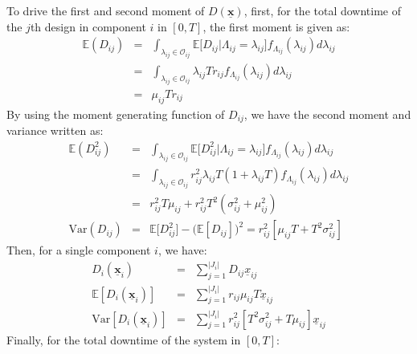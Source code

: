 \documentclass[preprint,12pt]{elsarticle}
\begin{document}
To drive the first and second moment of $D(\boldsymbol{\underline{x}})$, first, for the total downtime of the $j$th design in component $i$ in $[0, T]$, the first moment is given as:
\small
\begin{eqnarray}
\mathbb{E}(D_{ij}) &=& \int_{\lambda_{ij}\in \mathcal O_{ij}}\mathbb{E}\bigg[D_{ij} \bigg\vert \Lambda_{ij}=\lambda_{ij}\bigg]f_{\Lambda_{ij}}(\lambda_{ij})d\lambda_{ij} \nonumber\\
 &=& \int_{\lambda_{ij}\in \mathcal O_{ij} } \lambda_{ij}T r_{ij}f_{\Lambda_{ij}}(\lambda_{ij})d\lambda_{ij} \nonumber\\
 &=& \mu_{ij} T r_{ij}
\end{eqnarray}
\normalsize
By using the moment generating function of $D_{ij}$, we have the second moment and variance written as:
\small
\begin{eqnarray}
\mathbb{E}(D^{2}_{ij}) &=& \int_{\lambda_{ij}\in \mathcal O_{ij}}\mathbb{E}\bigg[D^{2}_{ij} \bigg\vert \Lambda_{ij}=\lambda_{ij}\bigg]f_{\Lambda_{ij}}(\lambda_{ij})d\lambda_{ij}  \nonumber\\
&=& \int_{\lambda_{ij}\in \mathcal O_{ij}} {r^{2}_{ij}\lambda_{ij}T(1+\lambda_{ij}T)f_{\Lambda_{ij}}(\lambda_{ij})d\lambda_{ij}} \nonumber\\
&=& r^{2}_{ij}T\mu_{ij} + r^{2}_{ij}T^{2}(\sigma^{2}_{ij}+\mu^{2}_{ij}) \\
\textrm{Var}(D_{ij})&=&\mathbb{E}\bigg[D^{2}_{ij}\bigg] - \bigg(\mathbb{E}[D_{ij}]\bigg)^{2}=r^{2}_{ij}[\mu_{ij}T + T^{2}\sigma^{2}_{ij}]
\end{eqnarray}
\normalsize
Then, for a single component $i$, we have:
\small
\begin{eqnarray}
D_{i}(\boldsymbol{\underline{x}}_{i}) &=& \sum_{j=1}^{\lvert J_{i}\rvert}{D_{ij}\underline{x}_{ij}}\\
\mathbb{E}[D_{i}(\boldsymbol{\underline{x}}_{i})] &=&\sum_{j=1}^{\lvert J_{i} \rvert}{r_{ij}\mu_{ij}T\underline{x}_{ij}} \\
\textrm{Var}[D_{i}(\boldsymbol{\underline{x}}_{i})]&=&\sum_{j=1}^{\lvert J_{i} \rvert}{r_{ij}^{2}[T^{2}\sigma^{2}_{ij}+T\mu_{ij}]\underline{x}_{ij}}
\end{eqnarray}
\normalsize
Finally, for the total downtime of the system in $[0, T]$:
\small
\end{document}
